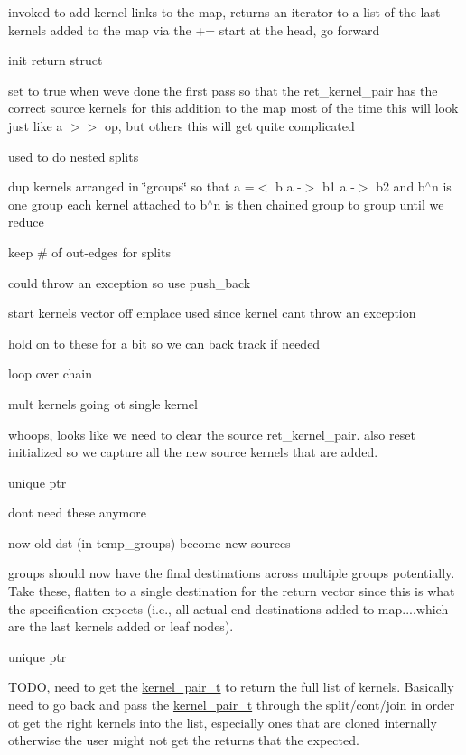 invoked to add kernel links to the map, returns an iterator to a list of the last kernels added to the map via the += start at the head, go forward

init return struct

set to true when we\textquotesingle{}ve done the first pass so that the ret\+\_\+kernel\+\_\+pair has the correct source kernels for this addition to the map most of the time this will look just like a \textquotesingle{}$>$$>$\textquotesingle{} op, but others this will get quite complicated

used to do nested splits

dup kernels arranged in \char`\"{}groups\char`\"{} so that a =$<$ b a -\/$>$ b1 a -\/$>$ b2 and b$^\wedge$n is one group each kernel attached to b$^\wedge$n is then chained group to group until we reduce

keep \# of out-\/edges for splits

could throw an exception so use push\+\_\+back

start kernels vector off emplace used since kernel can\textquotesingle{}t throw an exception

hold on to these for a bit so we can back track if needed

loop over chain

mult kernels going ot single kernel

whoops, looks like we need to clear the source ret\+\_\+kernel\+\_\+pair. also reset initialized so we capture all the new source kernels that are added.

unique ptr

don\textquotesingle{}t need these anymore

now old dst (in temp\+\_\+groups) become new sources

groups should now have the final destinations across multiple groups potentially. Take these, flatten to a single destination for the return vector since this is what the specification expects (i.\+e., all actual end destinations added to map....which are the last kernels added or leaf nodes).

unique ptr

T\+O\+DO, need to get the \hyperlink{classkernel__pair__t}{kernel\+\_\+pair\+\_\+t} to return the full list of kernels. Basically need to go back and pass the \hyperlink{classkernel__pair__t}{kernel\+\_\+pair\+\_\+t} through the split/cont/join in order ot get the right kernels into the list, especially ones that are cloned internally otherwise the user might not get the returns that the expected.

